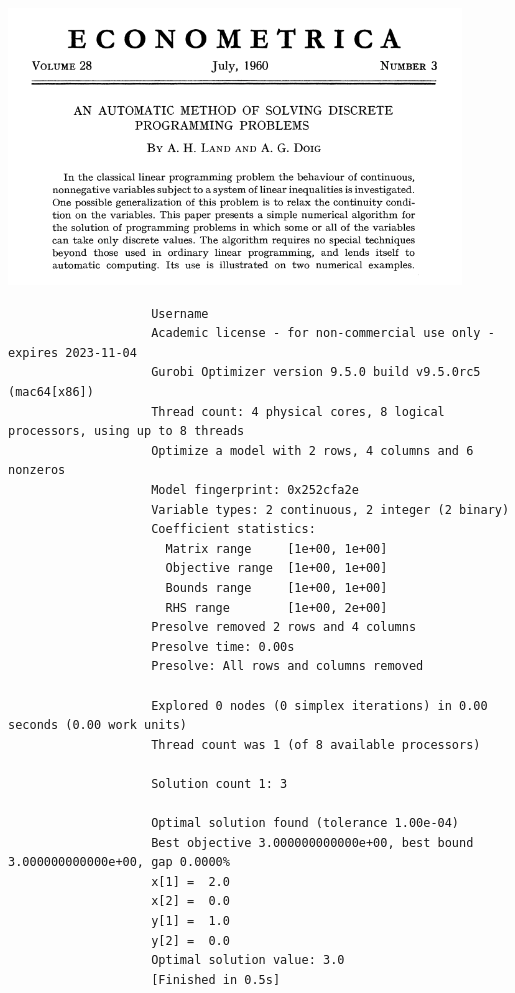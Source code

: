 \newpage


\begin{center}
\centering
\includegraphics[width=12cm]{fig/econometrica.png}
\end{center}



{\tiny

\begin{verbatim}
                    Username
                    Academic license - for non-commercial use only - expires 2023-11-04
                    Gurobi Optimizer version 9.5.0 build v9.5.0rc5 (mac64[x86])
                    Thread count: 4 physical cores, 8 logical processors, using up to 8 threads
                    Optimize a model with 2 rows, 4 columns and 6 nonzeros
                    Model fingerprint: 0x252cfa2e
                    Variable types: 2 continuous, 2 integer (2 binary)
                    Coefficient statistics:
                      Matrix range     [1e+00, 1e+00]
                      Objective range  [1e+00, 1e+00]
                      Bounds range     [1e+00, 1e+00]
                      RHS range        [1e+00, 2e+00]
                    Presolve removed 2 rows and 4 columns
                    Presolve time: 0.00s
                    Presolve: All rows and columns removed
                    
                    Explored 0 nodes (0 simplex iterations) in 0.00 seconds (0.00 work units)
                    Thread count was 1 (of 8 available processors)
                    
                    Solution count 1: 3 
                    
                    Optimal solution found (tolerance 1.00e-04)
                    Best objective 3.000000000000e+00, best bound 3.000000000000e+00, gap 0.0000%
                    x[1] =  2.0
                    x[2] =  0.0
                    y[1] =  1.0
                    y[2] =  0.0
                    Optimal solution value: 3.0
                    [Finished in 0.5s]
\end{verbatim}
}


